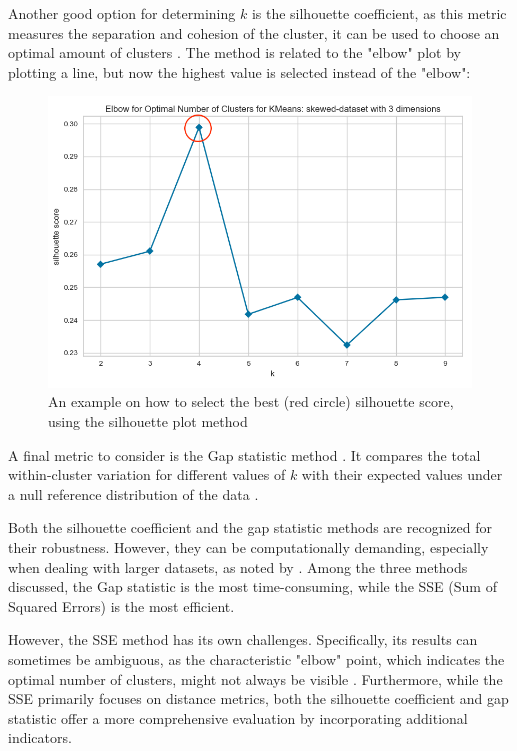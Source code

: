 Another good option for determining $k$ is the silhouette coefficient, as this metric measures the separation and cohesion of the cluster, it can be used to choose an optimal amount of clusters \citep{saputra_effect_2020}. The method is related to the "elbow" plot by plotting a line, but now the highest value is selected instead of the "elbow":
\begin{figure}
  \centering
  \includegraphics[width=0.75\linewidth]{skewed-dataset-3-kmeans.png}
  \caption{An example on how to select the best (red circle) silhouette score, using the silhouette plot method \citep{saputra_effect_2020}}
  \label{fig:k-select-silhouette}
\end{figure}
A final metric to consider is the Gap statistic method \citep{yuan_research_2019}.
It compares the total within-cluster variation for different values of $k$ with their expected values under a null reference distribution of the data \citep{tibshirani_estimating_2001}.

Both the silhouette coefficient and the gap statistic methods are recognized for their robustness.
However, they can be computationally demanding, especially when dealing with larger datasets, as noted by \citep{yuan_research_2019}.
Among the three methods discussed, the Gap statistic is the most time-consuming, while the SSE (Sum of Squared Errors) is the most efficient.

However, the SSE method has its own challenges. Specifically, its results can sometimes be ambiguous, as the characteristic "elbow" point, which indicates the optimal number of clusters, might not always be visible \citep{yuan_research_2019, kodinariya_review_2013}.
Furthermore, while the SSE primarily focuses on distance metrics, both the silhouette coefficient and gap statistic offer a more comprehensive evaluation by incorporating additional indicators.

